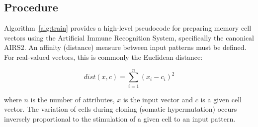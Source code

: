 \subsection{Procedure}
Algorithm~\ref{alg:train} provides a high-level pseudocode for preparing memory cell vectors using the Artificial Immune Recognition System, specifically the canonical AIRS2. 
An affinity (distance) measure between input patterns must be defined. For real-valued vectors, this is commonly the Euclidean distance:

\begin{equation}
	dist(x,c) = \sum_{i=1}^{n} (x_i - c_i)^2
\end{equation}

where $n$ is the number of attributes, $x$ is the input vector and $c$ is a given cell vector. The variation of cells during cloning (somatic hypermutation) occurs inversely proportional to the stimulation of a given cell to an input pattern.

